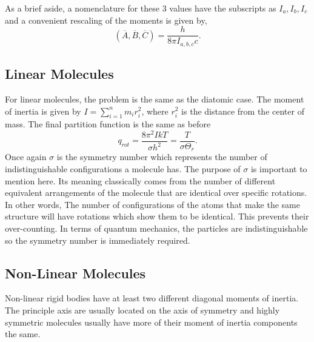 As a brief aside, a nomenclature for these 3 values have the subscripts as $I_a,
I_b, I_c$ and a convenient rescaling of the moments is given by,
\begin{equation*}
	{(\overline{A},\overline{B},\overline{C})} = \frac{h}{8\pi I_{a,b,c} c}.
\end{equation*}

\subsection{Linear Molecules}
For linear molecules, the problem is the same as the diatomic case. The moment
of inertia is given by $I = \sum_{i=1}^{n}{m_i r_i^2}$, where $r_{i}^2$ is the
distance from the center of mass. The final partition function is the same as
before
\begin{equation*}
	q_{rot} = \frac{8 \pi^2 IkT}{\sigma h^2} = \frac{T}{\sigma \Theta_r}.
\end{equation*}
Once again $\sigma$ is the symmetry number which represents the number of
indistinguishable configurations a molecule has. The purpose of $\sigma$ is
important to mention here. Its meaning classically comes from the number of
different equivalent arrangements of the molecule that are identical over
specific rotations. In other words, The number of configurations of the atoms
that make the same structure will have rotations which show them to be
identical. This prevents their over-counting. In terms of quantum mechanics, the
particles are indistinguishable so the symmetry number is immediately required.

\subsection{Non-Linear Molecules}
Non-linear rigid bodies have at least two different diagonal moments of
inertia. The principle axis are usually located on the axis of symmetry and
highly symmetric molecules usually have more of their moment of inertia
components the same.

